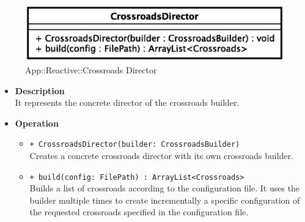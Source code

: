 \begin{figure}[h]
\centering
\includegraphics[scale=0.6,keepaspectratio]{images/solution/crossroads_director.eps}
\caption{App::Reactive::Crossroads Director}
\label{fig:sd-app-crossroads_director}
\end{figure}
\FloatBarrier
\begin{itemize}
  \item \textbf{Description} \\
    It represents the concrete director of the crossroads builder.
  \item \textbf{Operation}
  \begin{itemize} 
    \item \texttt{+ CrossroadsDirector(builder: CrossroadsBuilder)} \\
Creates a concrete crossroads director with its own crossroads builder.
    \item \texttt{+ build(config: FilePath) : ArrayList<Crossroads>} \\
Builds a list of crossroads according to the configuration file. 
It uses the builder multiple times 
to create incrementally a specific configuration of the
requested crossroads specified in the configuration file. 
  \end{itemize}
\end{itemize}
